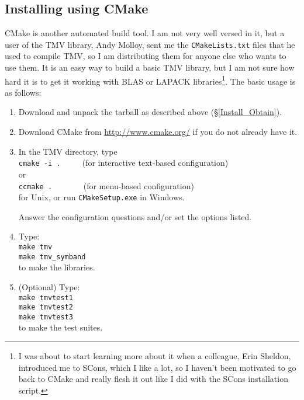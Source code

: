 \documentclass[twoside,letterpaper,11pt]{article}
\begin{document}
\subsection{Installing using CMake}
\label{Install_CMake}

CMake is another automated build tool.  I am not very well versed in it, but a user of the 
TMV library, Andy Molloy, sent me the \texttt{CMakeLists.txt} files that he used to compile TMV,
so I am distributing them for anyone else who wants
to use them.  It is an easy way to build a basic TMV library, but I am not sure how hard it is
to get it working with BLAS or LAPACK libraries\footnote{
I was about to start learning more about it when a colleague, Erin Sheldon, introduced me to
SCons, which I like a lot, so I haven't been motivated to go back to CMake and really flesh
it out like I did with the SCons installation script.}.
The basic usage is as follows:

\begin{enumerate}
\item Download and unpack the tarball as described above (\S\ref{Install_Obtain}).

\item
Download CMake from \url{http://www.cmake.org/} if you do not already have it.

\item
In the TMV directory, type\\
\texttt{cmake -i .} $\qquad$ (for interactive text-based configuration) \\
or\\
\texttt{ccmake .} $\qquad \quad \,$ (for menu-based configuration) \\
for Unix, or run \texttt{CMakeSetup.exe} in Windows.

Answer the configuration questions and/or set the options listed.

\item
Type:\\
\texttt{make tmv}\\
\texttt{make tmv\_symband}\\
to make the libraries.

\item
(Optional) Type:\\
\texttt{make tmvtest1}\\
\texttt{make tmvtest2}\\
\texttt{make tmvtest3}\\
to make the test suites.

\end{enumerate}
\end{document}
